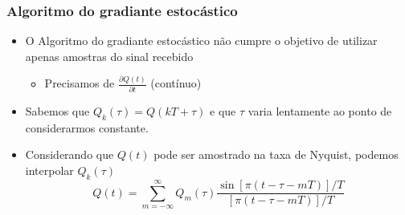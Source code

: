 \begin{frame}
	\frametitle{Algoritmo do gradiante estocástico}
	\begin{itemize}
		\item O Algoritmo do gradiante estocástico não cumpre o objetivo de utilizar apenas amostras do sinal recebido
		\begin{itemize}
			\item Precisamos de $\frac{\partial Q(t)}{\partial t}$ (contínuo)
		\end{itemize}
	\item Sabemos que $Q_k(\tau) = Q(kT+\tau)$ e que $\tau$ varia lentamente ao ponto de considerarmos constante.
	\item Considerando que $Q(t)$ pode ser amostrado na taxa de Nyquist, podemos interpolar $Q_k(\tau)$
	\begin{equation*}
	Q(t) = \sum_{m=-\infty}^{\infty}Q_m(\tau) \frac{\sin [\pi (t-\tau-mT) ]/T}{\left[\pi (t-\tau-mT)\right]/T}
	\end{equation*}
	\end{itemize}
\end{frame}


